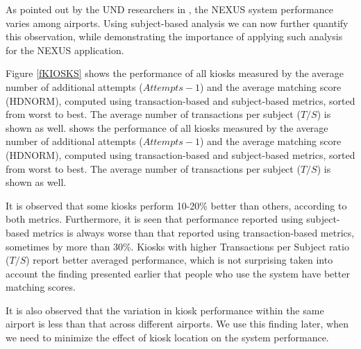 \documentclass{cta-author}%
\begin{document}

As pointed out by the  UND researchers in \cite{Bowyer2015-cvpr,Bowyer-BTAS2016}, the NEXUS system performance  varies  among  airports.
Using subject-based analysis 
we can now
further quantify this observation, while demonstrating the importance of applying such analysis for the NEXUS application.

Figure  \ref{fKIOSKS} 
shows the performance of all kiosks measured by the average number of additional attempts ($Attempts-1$) and the average matching score (HDNORM), computed using transaction-based and subject-based metrics, sorted from worst to best. The average number of transactions per subject ($T/S$) is shown as well.
shows the performance of all kiosks measured by the average number of additional attempts ($Attempts-1$) and the average matching score (HDNORM), computed using transaction-based and subject-based metrics, sorted from worst to best. The average number of transactions per subject ($T/S$) is shown as well.




It is  observed that 
some kiosks perform 10-20\% better than others, according to both 
metrics. 
Furthermore, it is seen that  performance reported using subject-based metrics is always worse than that reported using transaction-based metrics, sometimes by more than 30\%. 
Kiosks with higher Transactions per Subject ratio ($T/S$) report better averaged performance, 
which is not surprising taken into account the finding presented earlier that people who use the system  have better matching scores.


It is also observed that the variation in kiosk performance within the same airport  is less than that across different airports. We use this finding later, when we need to minimize the effect of kiosk location on the system performance.
\end{document}
